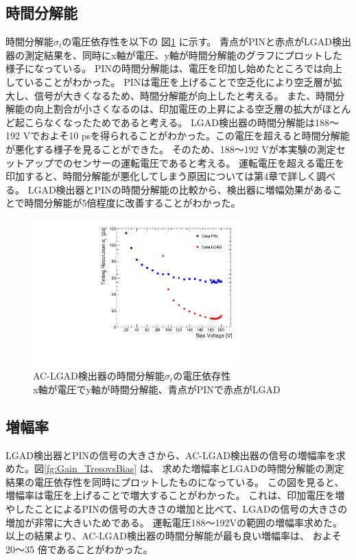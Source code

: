 \subsection{時間分解能}
時間分解能$\sigma_t$の電圧依存性を以下の 図\ref{fg:TresovsBias} に示す。
青点がPINと赤点がLGAD検出器の測定結果を、同時にx軸が電圧、y軸が時間分解能のグラフにプロットした様子になっている。
PINの時間分解能は、電圧を印加し始めたところでは向上していることがわかった。
PINは電圧を上げることで空乏化により空乏層が拡大し、信号が大きくなるため、時間分解能が向上したと考える。
また、時間分解能の向上割合が小さくなるのは、印加電圧の上昇による空乏層の拡大がほとんど起こらなくなったためであると考える。
LGAD検出器の時間分解能は188〜192 Vでおよそ10 psを得られることがわかった。この電圧を超えると時間分解能が悪化する様子を見ることができた。
そのため、188〜192 Vが本実験の測定セットアップでのセンサーの運転電圧であると考える。
運転電圧を超える電圧を印加すると、時間分解能が悪化してしまう原因については第4章で詳しく調べる。
LGAD検出器とPINの時間分解能の比較から、検出器に増幅効果があることで時間分解能が5倍程度に改善することがわかった。

\begin{figure}[h]
    \centering
    \includegraphics[width=8cm]{fig/graph/TresovsVoltage.pdf}
    \caption[AC-LGAD検出器の時間分解能$\sigma_t$の電圧依存性]{AC-LGAD検出器の時間分解能$\sigma_t$の電圧依存性\\x軸が電圧でy軸が時間分解能、青点がPINで赤点がLGAD}
    \label{fg:TresovsBias}
\end{figure}

\subsection{増幅率}
LGAD検出器とPINの信号の大きさから、AC-LGAD検出器の信号の増幅率を求めた。図\ref{fg:Gain_TresovsBias} は、
求めた増幅率とLGADの時間分解能の測定結果の電圧依存性を同時にプロットしたものになっている。
この図を見ると、増幅率は電圧を上げることで増大することがわかった。
これは、印加電圧を増やしたことによるPINの信号の大きさの増加と比べて、LGADの信号の大きさの増加が非常に大きいためである。
運転電圧188〜192Vの範囲の増幅率求めた。
以上の結果より、AC-LGAD検出器の時間分解能が最も良い増幅率は、 およそ20〜35 倍であることがわかった。

